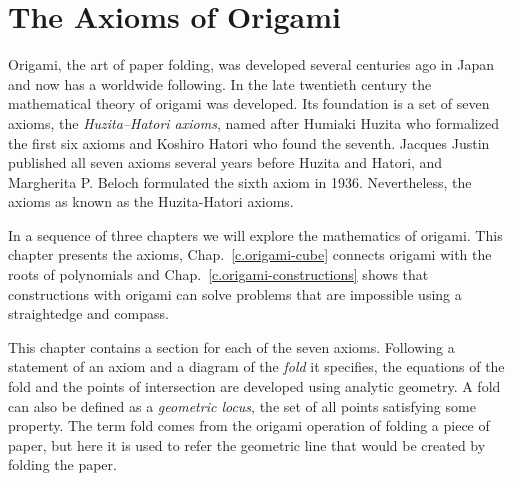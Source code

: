 

\chapter{The Axioms of Origami}\label{c.origami-axioms}




Origami, the art of paper folding, was developed several centuries ago in Japan and now has a worldwide following. In the late twentieth century the mathematical theory of origami was developed. Its foundation is a set of seven axioms, the 
\emph{Huzita–Hatori axioms}, named after Humiaki Huzita who formalized the first six axioms and Koshiro Hatori who found the seventh. Jacques Justin published all seven axioms several years before Huzita and Hatori, and Margherita P. Beloch formulated the sixth axiom in 1936. Nevertheless, the axioms as known as the Huzita-Hatori axioms.

In a sequence of three chapters we will explore the mathematics of origami. This chapter presents the axioms, Chap.~\ref{c.origami-cube} connects origami with the roots of polynomials and Chap.~\ref{c.origami-constructions} shows that constructions with origami can solve problems that are impossible using a straightedge and compass.
 
This chapter contains a section for each of the seven axioms. Following a statement of an axiom and a diagram of the \emph{fold} it specifies, the equations of the fold and the points of intersection are developed using analytic geometry. A fold can also be defined as a \emph{geometric locus}, the set of all points satisfying some property. The term fold comes from the origami operation of folding a piece of paper, but here it is used to refer the geometric line that would be created by folding the paper.

